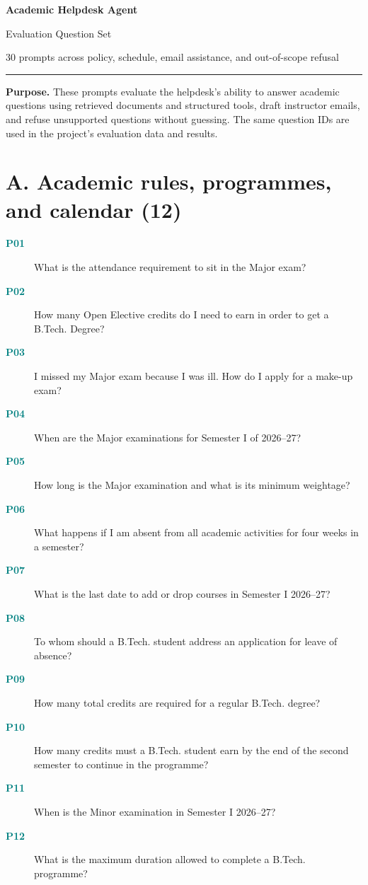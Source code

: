 \documentclass[11pt]{article}
\newcommand{\qid}[1]{\textcolor{teal}{\textbf{#1}}}
\newcommand{\question}[2]{\item[\qid{#1}] #2}
\begin{document}
\begin{center}
  {\color{navy}\LARGE\bfseries Academic Helpdesk Agent}\par
  \vspace{0.18cm}
  {\color{teal}\Large Evaluation Question Set}\par
  \vspace{0.25cm}
  {\small 30 prompts across policy, schedule, email assistance, and out-of-scope refusal}\par
  \vspace{0.4cm}
  {\color{navy}\rule{0.92\linewidth}{1pt}}
\end{center}

\textbf{Purpose.} These prompts evaluate the helpdesk's ability to answer academic questions using retrieved documents and structured tools, draft instructor emails, and refuse unsupported questions without guessing. The same question IDs are used in the project's evaluation data and results.

\section*{A. Academic rules, programmes, and calendar (12)}
\begin{description}
\question{P01}{What is the attendance requirement to sit in the Major exam?}
\question{P02}{How many Open Elective credits do I need to earn in order to get a B.Tech. Degree?}
\question{P03}{I missed my Major exam because I was ill. How do I apply for a make-up exam?}
\question{P04}{When are the Major examinations for Semester I of 2026--27?}
\question{P05}{How long is the Major examination and what is its minimum weightage?}
\question{P06}{What happens if I am absent from all academic activities for four weeks in a semester?}
\question{P07}{What is the last date to add or drop courses in Semester I 2026--27?}
\question{P08}{To whom should a B.Tech. student address an application for leave of absence?}
\question{P09}{How many total credits are required for a regular B.Tech. degree?}
\question{P10}{How many credits must a B.Tech. student earn by the end of the second semester to continue in the programme?}
\question{P11}{When is the Minor examination in Semester I 2026--27?}
\question{P12}{What is the maximum duration allowed to complete a B.Tech. programme?}
\end{description}
\end{document}
